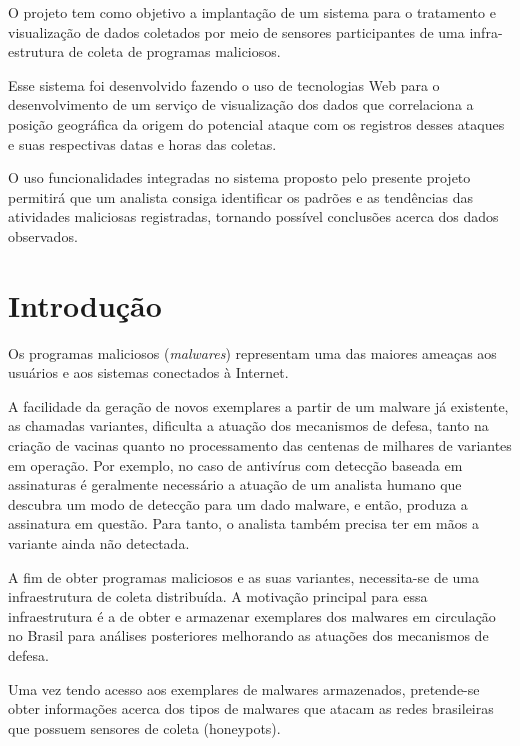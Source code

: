 \author{Alexandre Or Cansian Baruque}


\beforepreface
\begin{oresumo}
O projeto tem como objetivo a implantação de um sistema para o tratamento e visualização de dados coletados por meio de sensores participantes de uma infra-estrutura de coleta de programas maliciosos.

Esse sistema foi desenvolvido fazendo o uso de tecnologias Web para o desenvolvimento de um serviço de visualização dos dados que correlaciona a posição geográfica da origem do potencial ataque com os registros desses ataques e suas respectivas datas e horas das coletas.

O uso funcionalidades integradas no sistema proposto pelo presente projeto permitirá que um analista consiga identificar os padrões e as tendências das atividades maliciosas registradas, tornando possível conclusões acerca dos dados observados.
\end{oresumo}
\afterpreface   


\chapter{Introdução}
Os programas maliciosos (\emph{malwares}) representam uma das maiores ameaças aos usuários e aos sistemas conectados à Internet. 

A facilidade da geração de novos exemplares a partir de um malware já existente, as chamadas variantes, dificulta a atuação dos mecanismos de defesa, tanto na criação de vacinas quanto no processamento das centenas de milhares de variantes em operação. Por exemplo, no caso de antivírus com detecção baseada em assinaturas é geralmente necessário a atuação de um analista humano que descubra um modo de detecção para um dado malware, e  então, produza a assinatura em questão. Para tanto, o analista também precisa ter em mãos a variante ainda não detectada.

A fim de obter programas maliciosos e as suas variantes, necessita-se de uma infraestrutura de coleta distribuída. A motivação principal para essa infraestrutura é a de obter e armazenar exemplares dos malwares em circulação no Brasil para análises posteriores melhorando as atuações dos mecanismos de defesa. 

Uma vez tendo acesso aos exemplares de malwares armazenados, pretende-se obter informações acerca dos tipos de malwares que atacam as redes brasileiras que possuem sensores de coleta (honeypots). 

